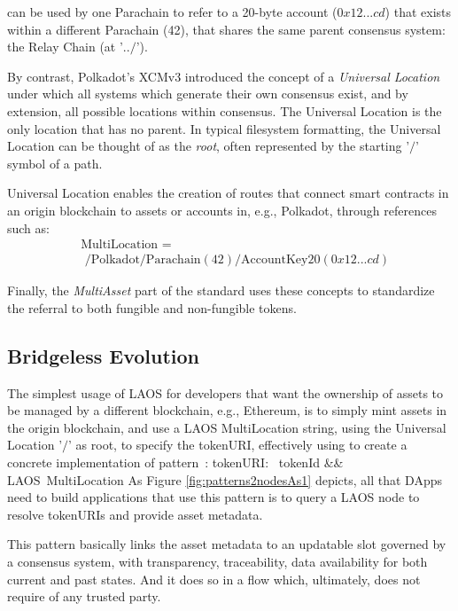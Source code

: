 can be used by one Parachain to refer to a 20-byte account ($0x12...cd$)
that exists within a different Parachain (42), that shares the same parent consensus
system: the Relay Chain (at '$../$').

By contrast, Polkadot's XCMv3\cite{multilocationXCMv3} introduced 
the concept of a {\it Universal Location} under which all systems
which generate their own consensus exist, and by extension,
all possible locations within consensus. The Universal Location is the only location
that has no parent. In typical filesystem formatting, the Universal Location 
can be thought of as the {\it root},
often represented by the starting '$/$' symbol of a path.

Universal Location enables the creation of routes that
connect smart contracts in an origin blockchain
to assets or accounts in, e.g., Polkadot, through references such as:
\begin{align}
     & \text{MultiLocation =}  \label{eq:multilocation2} \\
     & \,\, /\text{Polkadot}/\text{Parachain}(42)/\text{AccountKey20}(0x12...cd) \nonumber
\end{align}

Finally, the {\it MultiAsset} part of the standard uses these concepts to
standardize the referral to both fungible and non-fungible tokens.

\subsection{Bridgeless Evolution}\label{sec:bridgless-evo}

The simplest usage of LAOS for developers that want the
ownership of assets to be managed by a different blockchain, e.g., Ethereum,
is to simply mint assets in the origin blockchain, and 
use a LAOS MultiLocation string, using the Universal Location '$/$' as root,
to specify the tokenURI, 
effectively using  to create a concrete implementation
of pattern :
\bea
\mbox{tokenURI:} \mbox{ tokenId} &\rightarrow & \mbox{LAOS MultiLocation}
\nn 
\label{eq:tokenURILaos}
\eea 
As Figure \ref{fig:patterns2nodesAs1} depicts, all that DApps need 
to build applications that use this pattern 
is to query a LAOS node to resolve tokenURIs and provide asset metadata.

This pattern basically links the asset metadata to an updatable slot governed
by a consensus system, with transparency, traceability,
data availability for both current 
and past states. And it does so in a flow which, ultimately, does not require of 
any trusted party.

